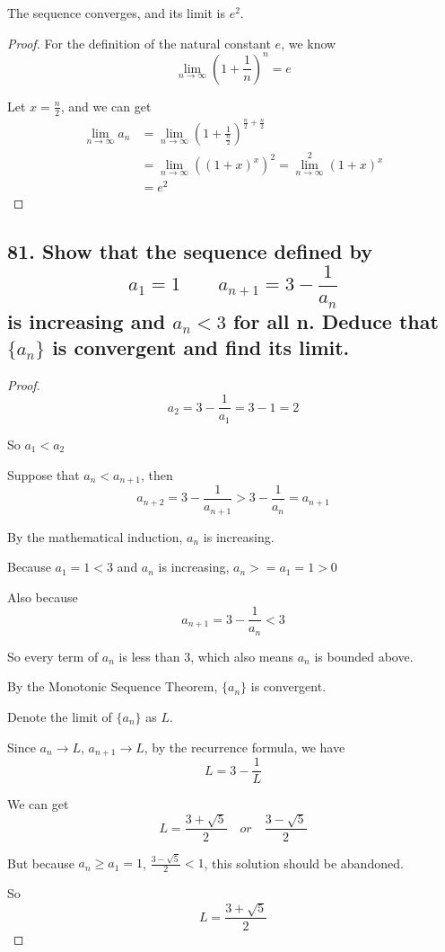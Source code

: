 \documentclass{article}
\begin{document}
    The sequence converges, and its limit is $e^2$.
    \begin{proof}
        For the definition of the natural constant $e$, we know $$\lim_{n \to \infty}(1 + \frac{1}{n}) ^ n  = e$$

        Let $x = \frac{n}{2}$, and we can get
        $$
        \begin{aligned}
            \lim_{n \to \infty}a_n &= \lim_{n \to \infty}(1 + \frac{1}{\frac{n}{2}})^{\frac{n}{2}+ \frac{n}{2}} \\
            &= \lim_{n \to \infty}((1 + x)^x)^2 = \lim_{n \to \infty}^2(1 + x)^x \\
            &= e^2
        \end{aligned}
        $$
    \end{proof}

    \subsection*{81. Show that the sequence defined by $$a_1 = 1 \qquad   a_{n + 1} = 3 - \frac{1}{a_n}$$ is increasing and $a_n < 3$ for all n. Deduce that $\{ a_n\}$ is convergent and find its limit.}

    \begin{proof}

        $$a_2 = 3 - \frac{1}{a_1} = 3 - 1 = 2$$

        So $a_1 < a_2$

        Suppose that $a_n < a_{n+1}$, then $$a_{n+2} = 3 - \frac{1}{a_{n+1}} > 3 - \frac{1}{a_n} = a_{n + 1}$$

        By the mathematical induction, $a_n$ is increasing.
        
        Because $a_1 = 1 < 3$ and $a_n$ is increasing, $a_n >= a_1 = 1 > 0$

        Also because$$a_{n+1} = 3 - \frac{1}{a_n} < 3$$

        So every term of $a_n$ is less than $3$, which also means $a_n$ is bounded above.

        By the Monotonic Sequence Theorem, $\{ a_n \}$ is convergent.

        Denote the limit of $\{a_n\}$ as $L$.

        Since $a_n \to L$, $a_{n+1} \to L$, by the recurrence formula, we have $$L = 3 - \frac{1}{L}$$

        We can get $$L = \frac{3 + \sqrt{5}}{2} \quad or \quad \frac{3 - \sqrt{5}}{2}$$

        But because $a_n \geq a_1 = 1$, $\frac{3 - \sqrt{5}}{2} < 1$, this solution should be abandoned.
        
        So $$L = \frac{3 + \sqrt{5}}{2}$$

    \end{proof}
        
\end{document}
